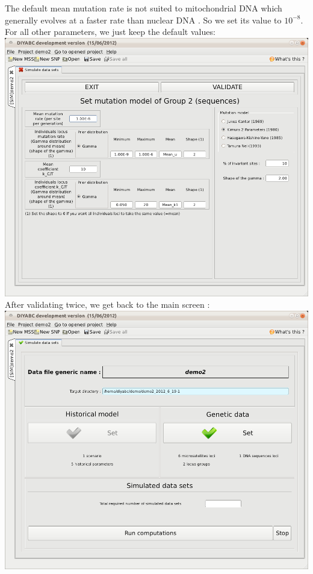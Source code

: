 The default mean mutation rate is not suited to mitochondrial DNA
which generally evolves at a faster rate than nuclear DNA \citep{HL2008}.
So we set its value to $10^{-8}$. For all other parameters, we just
keep the default values:\\


\includegraphics[scale=0.33]{gui_pictures/Capture-DIYABC-83} \\


After validating twice, we get back to the main screen :\\


\includegraphics[scale=0.33]{gui_pictures/Capture-DIYABC-84} \\


